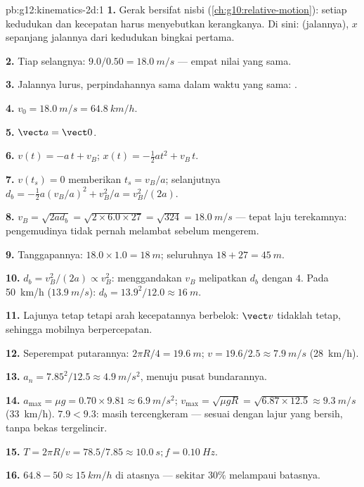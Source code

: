 \begin{solution}{pb:g12:kinematics-2d:1}
\textbf{1.} Gerak bersifat nisbi (\cref{ch:g10:relative-motion}): setiap
kedudukan dan kecepatan harus menyebutkan kerangkanya. Di sini:  (jalannya), $x$ sepanjang jalannya dari kedudukan bingkai pertama.

\textbf{2.} Tiap selangnya: $9.0/0.50 = \qty{18.0}{m/s}$ --- empat nilai
yang sama.

\textbf{3.} Jalannya lurus, perpindahannya sama dalam waktu yang sama:
.

\textbf{4.} $v_0 = \qty{18.0}{m/s} = \qty{64.8}{km/h}$.

\textbf{5.} $\vect a = \vect 0$.

\textbf{6.} $v(t) = -a\,t + v_B$; $x(t) = -\tfrac12 a t^2 + v_B\,t$.

\textbf{7.} $v(t_s) = 0$ memberikan $t_s = v_B/a$; selanjutnya
$d_b = -\tfrac12 a (v_B/a)^2 + v_B^2/a = v_B^2/(2a)$.

\textbf{8.} $v_B = \sqrt{2 a d_b} = \sqrt{2 \times 6.0 \times 27} =
\sqrt{324} = \qty{18.0}{m/s}$ --- tepat laju terekamnya: pengemudinya
tidak pernah melambat sebelum mengerem.

\textbf{9.} Tanggapannya: $18.0 \times 1.0 = \qty{18}{m}$; seluruhnya
$18 + 27 = \qty{45}{m}$.

\textbf{10.} $d_b = v_B^2/(2a) \propto v_B^2$: menggandakan $v_B$
melipatkan $d_b$ dengan $4$. Pada \qty{50}{km/h} ($\qty{13.9}{m/s}$):
$d_b = 13.9^2/12.0 \approx \qty{16}{m}$.

\textbf{11.} Lajunya tetap tetapi arah kecepatannya berbelok:
$\vect v$ tidaklah tetap, sehingga mobilnya berpercepatan.

\textbf{12.} Seperempat putarannya: $2\pi R/4 = \qty{19.6}{m}$;
$v = 19.6/2.5 \approx \qty{7.9}{m/s}$ (\qty{28}{km/h}).

\textbf{13.} $a_n = 7.85^2/12.5 \approx \qty{4.9}{m/s^2}$, menuju pusat
bundarannya.

\textbf{14.} $a_{\max} = \mu g = 0.70 \times 9.81 \approx
\qty{6.9}{m/s^2}$; $v_{\max} = \sqrt{\mu g R} =
\sqrt{6.87 \times 12.5} \approx \qty{9.3}{m/s}$ (\qty{33}{km/h}).
$7.9 < 9.3$: masih tercengkeram --- sesuai dengan lajur yang bersih,
tanpa bekas tergelincir.

\textbf{15.} $T = 2\pi R/v = 78.5/7.85 \approx \qty{10.0}{s};
f = \qty{0.10}{Hz}$.

\textbf{16.} $64.8 - 50 \approx \qty{15}{km/h}$ di atasnya --- sekitar
$30\%$ melampaui batasnya.


\end{solution}

